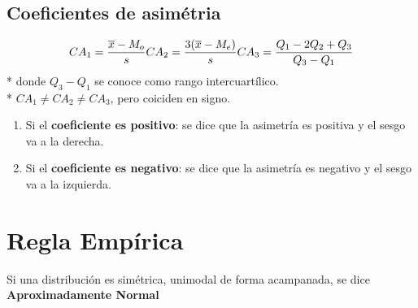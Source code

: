 \documentclass{templateNote}
\begin{document}
\subsection{Coeficientes de asimétria}
\begin{equation*}
    CA_1 = \frac{\overline{x} - M_o}{s} \\
    CA_2 = \frac{3(\overline{x} - M_e)}{s} \\
    CA_3 = \frac{Q_1 - 2Q_2 + Q_3}{Q_3 - Q_1} \\
\end{equation*}
* donde $Q_3 - Q_1$ se conoce como rango intercuartílico. \\
* $CA_1 \ne CA_2 \ne CA_3$, pero coiciden en signo.\\
\begin{enumerate}
    \item Si el \textbf{coeficiente es positivo}: se dice que la asimetría es positiva y el sesgo va a la derecha.
    \item Si el \textbf{coeficiente es negativo}: se dice que la asimetría es negativo y el sesgo va a la izquierda.
\end{enumerate}

\section{Regla Empírica}
\indent
Si una distribución es simétrica, unimodal de forma acampanada, se dice \textbf{Aproximadamente Normal}
\end{document}
